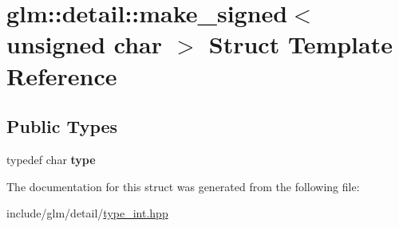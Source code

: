 \hypertarget{structglm_1_1detail_1_1make__signed_3_01unsigned_01char_01_4}{}\section{glm\+:\+:detail\+:\+:make\+\_\+signed$<$ unsigned char $>$ Struct Template Reference}
\label{structglm_1_1detail_1_1make__signed_3_01unsigned_01char_01_4}
\subsection*{Public Types}
\begin{DoxyCompactItemize}
\item 
\mbox{\label{structglm_1_1detail_1_1make__signed_3_01unsigned_01char_01_4_a38e3001baf7964626c6e7dff83b4ba95}} 
typedef char {\bfseries type}
\end{DoxyCompactItemize}


The documentation for this struct was generated from the following file\+:\begin{DoxyCompactItemize}
\item 
include/glm/detail/\hyperlink{type__int_8hpp}{type\+\_\+int.\+hpp}\end{DoxyCompactItemize}
